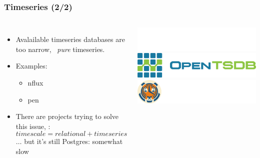 \documentclass[mathserif,usenames,dvipsnames]{beamer}
\begin{document}
\begin{frame}
\frametitle{Timeseries (2/2)}
\begin{columns}[T]
\begin{itemize}
\item Avalailable timeseries databases are too narrow, 
      \ie\ \emph{pure} timeseries.
\item Examples:
      \begin{itemize}
      \item {}nflux
      \item {}pen
      \end{itemize}
\item There are projects trying to solve this issue,
      \eg: \[
      timescale = relational + timeseries\]
      $\dots$ but it's still Postgres: somewhat slow
\end{itemize}
\vskip1.0cm
\includegraphics[width=0.7\linewidth]{../img/influxlogo.png}\\[12pt]
\includegraphics[width=0.8\linewidth]{../img/tsdblogo.png}\\[12pt]
\vskip0.5cm
\includegraphics[width=0.8\linewidth]{../img/timescalelogo.png}
\end{columns}
\end{frame}
\end{document}
